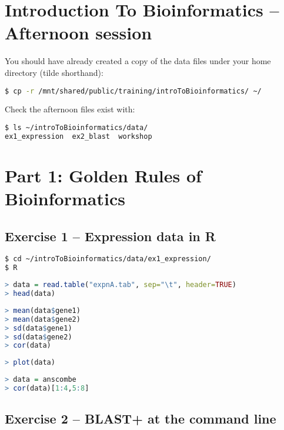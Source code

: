 \documentclass[a4paper]{article}
\begin{document}
\section*{Introduction To Bioinformatics -- Afternoon session}

You should have already created a copy of the data files under your home directory (tilde shorthand):
\begin{lstlisting}[language=bash]
$ cp -r /mnt/shared/public/training/introToBioinformatics/ ~/
\end{lstlisting}

Check the afternoon files exist with:
\begin{lstlisting}[language=bash]
$ ls ~/introToBioinformatics/data/
ex1_expression  ex2_blast  workshop
\end{lstlisting}

\section*{Part 1: Golden Rules of Bioinformatics}

\subsection*{Exercise 1 -- Expression data in R}

\begin{lstlisting}[language=bash]
$ cd ~/introToBioinformatics/data/ex1_expression/
$ R
\end{lstlisting}

\begin{lstlisting}[language=R]
> data = read.table("expnA.tab", sep="\t", header=TRUE)
> head(data)
\end{lstlisting}

\begin{lstlisting}[language=R]
> mean(data$gene1)
> mean(data$gene2)
> sd(data$gene1)
> sd(data$gene2)
> cor(data)
\end{lstlisting}

\begin{lstlisting}[language=R]
> plot(data)
\end{lstlisting}

\begin{lstlisting}[language=R]
> data = anscombe
> cor(data)[1:4,5:8]
\end{lstlisting}

\subsection*{Exercise 2 -- BLAST+ at the command line}
\end{document}
